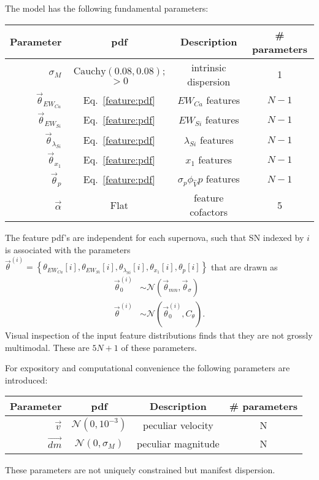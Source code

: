\documentclass{aastex61}   	%
\begin{document}
The model has the following fundamental parameters:
\begin{center}
\begin{tabular}{rccc}
\hline
Parameter & pdf & Description & \# parameters\\ \hline
$\sigma_M$ & $\text{Cauchy}(0.08, 0.08)$; $>0$ & intrinsic dispersion & 1\\
$\vec{\theta}_{EW_{Ca}}$ & Eq.~\ref{feature:pdf} & ${EW}_{Ca}$ features & $N-1$ \\
$\vec{\theta}_{EW_{Si}}$ & Eq.~\ref{feature:pdf}& ${EW}_{Si}$ features & $N-1$ \\
$\vec{\theta}_{\lambda_{Si}}$ &Eq.~\ref{feature:pdf}& ${\lambda}_{Si}$ features & $N-1$ \\
$\vec{\theta}_{x_1}$ & Eq.~\ref{feature:pdf}& ${x}_{1}$ features & $N-1$ \\
$\vec{\theta}_{p}$ & Eq.~\ref{feature:pdf}& $\sigma_p\phi_{\hat{V}}  {p} $ features & $N-1$ \\
$\vec{\alpha}$ & Flat& feature cofactors & 5 \\
\hline
\end{tabular}
\end{center}
The feature pdf's are independent for each supernova, such that SN indexed by $i$ is associated with the parameters
$\vec{\theta}^{(i)}=\left\{\theta_{EW_{Ca}}[i], \theta_{EW_{Si}}[i], \theta_{\lambda_{Si}}[i], \theta_{x_1}[i], \theta_{p}[i] \right\}$
that are drawn as
\begin{align}
\vec{\theta}^{(i)}_0 & \sim \mathcal{N}(\vec{\theta}_{\mathit{mn}}, \vec{\theta}_{\sigma})  \nonumber \\
\vec{\theta}^{(i)} & \sim \mathcal{N}(\vec{\theta}^{(i)}_0, C_{\theta}) .
\label{feature:pdf}
\end{align}
Visual inspection of the input feature distributions finds that they are not grossly multimodal.
These are $5N+1$ of these parameters.

For expository and computational convenience the following parameters are introduced:  
\begin{center}
\begin{tabular}{rccc}
\hline
Parameter & pdf & Description & \# parameters\\ \hline
$\vec{v}$ & $\mathcal{N}(0,10^{-3})$ &  peculiar velocity & N \\\
$ \overrightarrow{dm}$ &  $\mathcal{N}(0,\sigma_M)$  &  peculiar magnitude & N \\
\hline
\end{tabular}
\end{center}
These parameters are not uniquely constrained but manifest dispersion.
\end{document}
